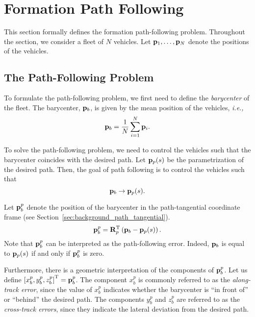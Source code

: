 \section{Formation Path Following}
\label{sec:background_formation_path_following}

This section formally defines the formation path-following problem.
Throughout the section, we consider a fleet of $N$ vehicles.
Let $\mathbf{p}_1, \ldots, \mathbf{p}_N$ denote the positions of the vehicles.

\subsection{The Path-Following Problem}
To formulate the path-following problem, we first need to define the \emph{barycenter} of the fleet.
The barycenter, $\mathbf{p}_b$, is given by the mean position of the vehicles, \emph{i.e.,}
\begin{equation}
    \mathbf{p}_b = \frac{1}{N} \sum_{i=1}^N \mathbf{p}_i.
    \label{eq:background_p_b}
\end{equation}

To solve the path-following problem, we need to control the vehicles such that the barycenter coincides with the desired path.
Let $\mathbf{p}_p(s)$ be the parametrization of the desired path.
Then, the goal of path following is to control the vehicles such that
\begin{equation}
    \mathbf{p}_b \rightarrow \mathbf{p}_p(s).
\end{equation}

Let $\mathbf{p}_b^p$ denote the position of the barycenter in the path-tangential coordinate frame (see Section~\ref{sec:background_path_tangential}).
\begin{equation}
    \mathbf{p}_b^p = \mathbf{R}_p^{\mathrm{T}} \left(\mathbf{p}_b - \mathbf{p}_p(s)\right).
\end{equation}
Note that $\mathbf{p}_b^p$ can be interpreted as the path-following error.
Indeed, $\mathbf{p}_b$ is equal to $\mathbf{p}_p(s)$ if and only if $\mathbf{p}_b^p$ is zero.

Furthermore, there is a geometric interpretation of the components of $\mathbf{p}_b^p$.
Let us define $\left[x_b^p, y_b^p, z_b^p\right]^{\mathrm{T}} = \mathbf{p}_b^p$.
The component $x_b^p$ is commonly referred to as the \emph{along-track error}, since the value of $x_b^p$ indicates whether the barycenter is ``in front of'' or ``behind'' the desired path.
The components $y_b^p$ and $z_b^p$ are referred to as the \emph{cross-track errors}, since they indicate the lateral deviation from the desired path.


